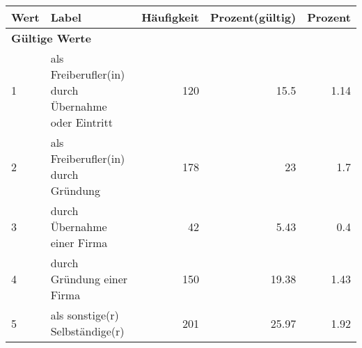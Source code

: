      \begin{longtable}{lXrrr}
     \toprule
     \textbf{Wert} & \textbf{Label} & \textbf{Häufigkeit} & \textbf{Prozent(gültig)} & \textbf{Prozent} \\
     \endhead
     \midrule
     \multicolumn{5}{l}{\textbf{Gültige Werte}}\\

     1 &
     \multicolumn{1}{X}{ als Freiberufler(in) durch Übernahme oder Eintritt   } &


       \num{120} &
       \num[round-mode=places,round-precision=2]{15,5} &
         \num[round-mode=places,round-precision=2]{1,14} \\

     2 &
     \multicolumn{1}{X}{ als Freiberufler(in) durch Gründung   } &


       \num{178} &
       \num[round-mode=places,round-precision=2]{23} &
         \num[round-mode=places,round-precision=2]{1,7} \\

     3 &
     \multicolumn{1}{X}{ durch Übernahme einer Firma   } &


       \num{42} &
       \num[round-mode=places,round-precision=2]{5,43} &
         \num[round-mode=places,round-precision=2]{0,4} \\

     4 &
     \multicolumn{1}{X}{ durch Gründung einer Firma   } &


       \num{150} &
       \num[round-mode=places,round-precision=2]{19,38} &
         \num[round-mode=places,round-precision=2]{1,43} \\

     5 &
     \multicolumn{1}{X}{ als sonstige(r) Selbständige(r)   } &


       \num{201} &
       \num[round-mode=places,round-precision=2]{25,97} &
         \num[round-mode=places,round-precision=2]{1,92} \\


\end{longtable}
